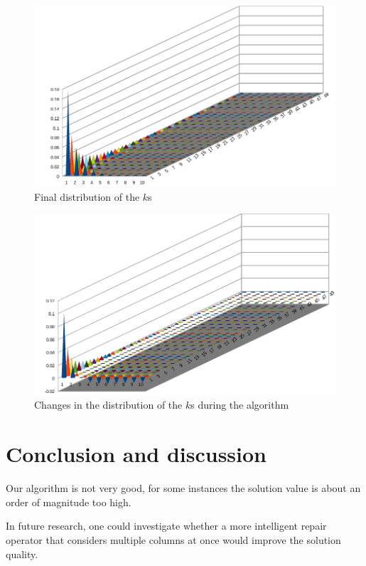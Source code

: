 \documentclass{article}
\begin{document}
\begin{figure}
	\includegraphics[width=\linewidth]{"kdist.png"}
	\caption{Final distribution of the $k$s}
	\label{finaldist}
\end{figure}

\begin{figure}
	\includegraphics[width=\linewidth]{"kdist-diff.png"}
	\caption{Changes in the distribution of the $k$s during the algorithm}
	\label{distdiff}
\end{figure}

\section{Conclusion and discussion}

Our algorithm is not very good, for some instances the solution value is about an order of magnitude too high.

In future research, one could investigate whether a more intelligent repair operator that considers multiple columns at once would improve the solution quality.


\printbibliography
\end{document}
